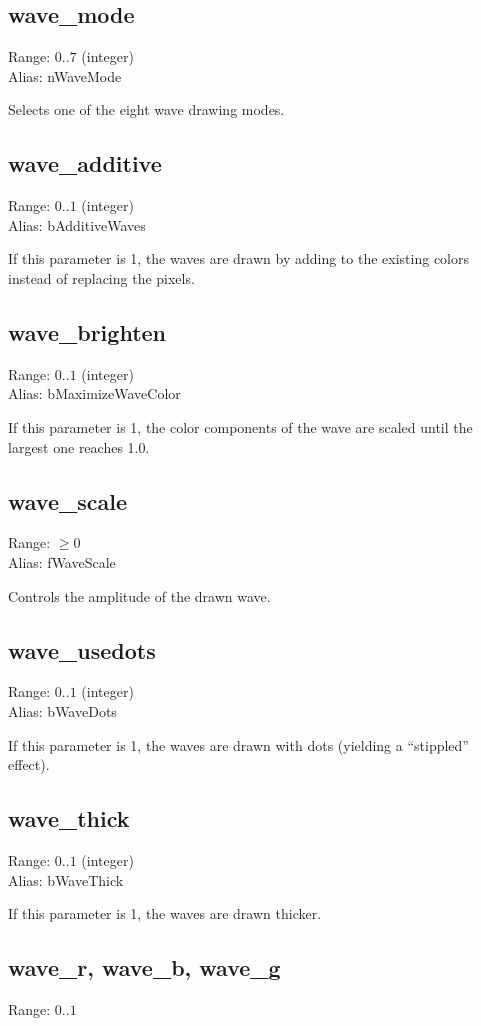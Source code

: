 \documentclass[11pt, a5paper, pagesize]{scrbook}
\begin{document}
\subsection{wave\_mode}
Range: $0..7$ (integer)\\
Alias: nWaveMode

Selects one of the eight wave drawing modes.

\subsection{wave\_additive}
Range: $0..1$ (integer)\\
Alias: bAdditiveWaves

If this parameter is 1, the waves are drawn by adding to the existing colors instead of replacing the pixels.

\subsection{wave\_brighten}
Range: $0..1$ (integer)\\
Alias: bMaximizeWaveColor

If this parameter is 1, the color components of the wave are scaled until the largest one reaches 1.0.

\subsection{wave\_scale}
Range: $\geq 0$\\
Alias: fWaveScale

Controls the amplitude of the drawn wave.

\subsection{wave\_usedots}
Range: $0..1$ (integer)\\
Alias: bWaveDots

If this parameter is 1, the waves are drawn with dots (yielding a ``stippled'' effect).

\subsection{wave\_thick}
Range: $0..1$ (integer)\\
Alias: bWaveThick

If this parameter is 1, the waves are drawn thicker.

\subsection{wave\_r, wave\_b, wave\_g}
Range: $0..1$
\end{document}
